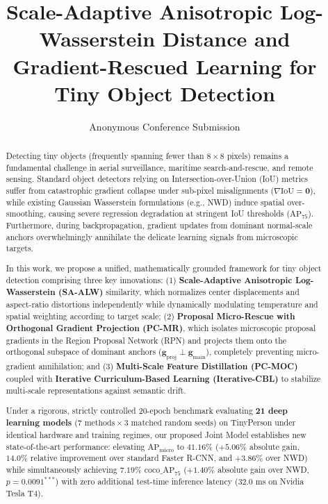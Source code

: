 \documentclass[10pt,twocolumn]{article}
\title{\textbf{Scale-Adaptive Anisotropic Log-Wasserstein Distance and Gradient-Rescued Learning for Tiny Object Detection}}
\author{Anonymous Conference Submission}
\date{}
\begin{document}
\maketitle

\begin{abstract}
Detecting tiny objects (frequently spanning fewer than $8\times 8$ pixels) remains a fundamental challenge in aerial surveillance, maritime search-and-rescue, and remote sensing. Standard object detectors relying on Intersection-over-Union (IoU) metrics suffer from catastrophic gradient collapse under sub-pixel misalignments ($\nabla \mathrm{IoU} = \mathbf{0}$), while existing Gaussian Wasserstein formulations (e.g., NWD) induce spatial over-smoothing, causing severe regression degradation at stringent IoU thresholds ($\mathrm{AP}_{75}$). Furthermore, during backpropagation, gradient updates from dominant normal-scale anchors overwhelmingly annihilate the delicate learning signals from microscopic targets. 

In this work, we propose a unified, mathematically grounded framework for tiny object detection comprising three key innovations: (1) \textbf{Scale-Adaptive Anisotropic Log-Wasserstein (SA-ALW)} similarity, which normalizes center displacements and aspect-ratio distortions independently while dynamically modulating temperature and spatial weighting according to target scale; (2) \textbf{Proposal Micro-Rescue with Orthogonal Gradient Projection (PC-MR)}, which isolates microscopic proposal gradients in the Region Proposal Network (RPN) and projects them onto the orthogonal subspace of dominant anchors ($\mathbf{g}_{\mathrm{proj}} \perp \mathbf{g}_{\mathrm{main}}$), completely preventing micro-gradient annihilation; and (3) \textbf{Multi-Scale Feature Distillation (PC-MOC)} coupled with \textbf{Iterative Curriculum-Based Learning (Iterative-CBL)} to stabilize multi-scale representations against semantic drift.

Under a rigorous, strictly controlled 20-epoch benchmark evaluating \textbf{21 deep learning models} ($7\text{ methods} \times 3\text{ matched random seeds}$) on TinyPerson under identical hardware and training regimes, our proposed Joint Model establishes new state-of-the-art performance: elevating $\mathrm{AP}_{\mathrm{micro}}$ to $\mathbf{41.16\%}$ ($+5.06\%$ absolute gain, $14.0\%$ relative improvement over standard Faster R-CNN, and $+3.86\%$ over NWD) while simultaneously achieving $\mathbf{7.19\%}$ $\mathrm{coco\_AP}_{75}$ ($+1.40\%$ absolute gain over NWD, $p = 0.0091^{***}$) with zero additional test-time inference latency ($32.0$ ms on Nvidia Tesla T4).
\end{abstract}









\end{document}
